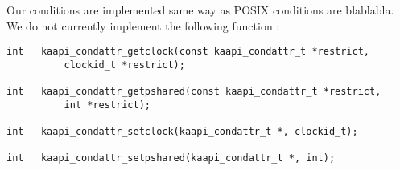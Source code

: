 Our conditions are implemented same way as POSIX conditions are blablabla. We
do not currently implement the following function :

\begin{verbatim}
int   kaapi_condattr_getclock(const kaapi_condattr_t *restrict,
          clockid_t *restrict);

int   kaapi_condattr_getpshared(const kaapi_condattr_t *restrict,
          int *restrict);

int   kaapi_condattr_setclock(kaapi_condattr_t *, clockid_t);

int   kaapi_condattr_setpshared(kaapi_condattr_t *, int);
\end{verbatim}








